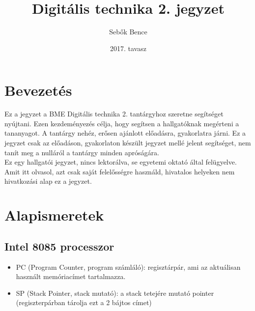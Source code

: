\documentclass{article}
\begin{document}
\title{Digitális technika 2. jegyzet}
\author{Sebők Bence}
\date{2017. tavasz}

\maketitle

\renewcommand{\contentsname}{Tartalomjegyzék}
\tableofcontents

\newpage %

\section{Bevezetés}
Ez a jegyzet a BME Digitális technika 2. tantárgyhoz szeretne segítséget nyújtani. Ezen kezdeményezés célja, hogy segítsen a hallgatóknak megérteni a tananyagot. A tantárgy nehéz, erősen ajánlott előadásra, gyakorlatra járni. Ez a jegyzet csak az előadáson, gyakorlaton készült jegyzet mellé jelent segítséget, nem tanít meg a nulláról a tantárgy minden apróságára. \\
Ez egy hallgatói jegyzet, nincs lektorálva, se egyetemi oktató által felügyelve. Amit itt olvasol, azt csak saját felelősségre használd, hivatalos helyeken nem hivatkozási alap ez a jegyzet.

\newpage %

\section{Alapismeretek}
\subsection{Intel 8085 processzor}
\begin{itemize}
	\item PC (Program Counter, program számláló): regisztárpár, ami az aktuálisan használt memóriacímet tartalmazza.
	\item SP (Stack Pointer, stack mutató): a stack tetejére mutató pointer (regiszterpárban tárolja ezt a 2 bájtos címet)
\end{itemize}
\end{document}
